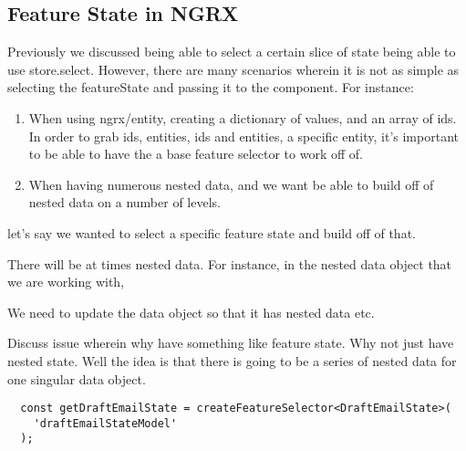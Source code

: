 \subsection{ Feature State in NGRX }
Previously we discussed being able to select a certain slice of state being
able to use store.select. However, there are many scenarios wherein it is not
as simple as selecting the featureState and passing it to the component. For
instance:
\begin{enumerate}
  \item When using ngrx/entity, creating a dictionary of values, and an array
  of ids. In order to grab ids, entities, ids and entities, a specific entity,
  it's important to be able to have the a base feature selector to work off of.
  \item When having numerous nested data, and we want be able to build off of
  nested data on a number of levels.
\end{enumerate}


let's say  we wanted to select a specific
feature state and build off of that.

There will be at times nested data. For instance, in the nested data object
that we are working with,

We need to update the data object so that it has nested data etc.

Discuss issue wherein why have something like feature state. Why not just have
nested state. Well the idea is that there is going to be a series of nested
data for one singular data object.

\begin{lstlisting}
  const getDraftEmailState = createFeatureSelector<DraftEmailState>(
    'draftEmailStateModel'
  );
\end{lstlisting}
